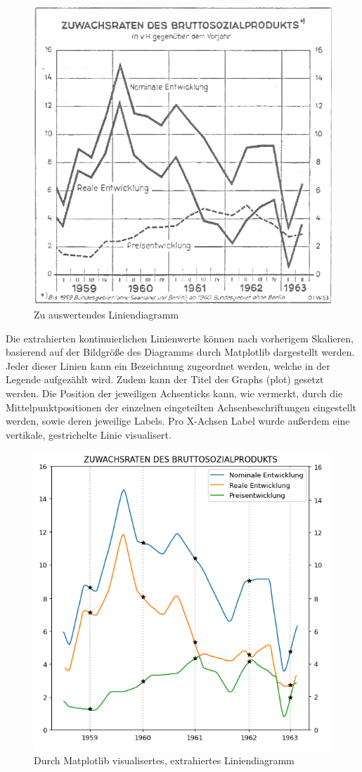 \begin{figure}[H]
    \centering
    \captionsetup{width=.75\linewidth}
    \includegraphics[width=.75\textwidth]{Implementation/img/extraction_input2.png}
    \caption{ Zu auswertendes Liniendiagramm}
    \label{fig:extraction_input}
\end{figure}

Die extrahierten kontinuierlichen Linienwerte können nach vorherigem Skalieren, basierend auf der Bildgröße des Diagramms durch Matplotlib dargestellt werden. Jeder dieser Linien kann ein Bezeichnung zugeordnet werden, welche in der Legende aufgezählt wird. Zudem kann der Titel des Graphs (plot) gesetzt werden. Die Position der jeweiligen Achsenticks kann, wie vermerkt, durch die Mittelpunktpositionen der einzelnen eingeteilten Achsenbeschriftungen eingestellt werden, sowie deren jeweilige Labels. Pro X-Achsen Label wurde außerdem eine vertikale, gestrichelte Linie visualisert.

\begin{figure}[H]
    \centering
    \captionsetup{width=.75\linewidth}
    \includegraphics[width=.75\textwidth]{Implementation/img/extraction_output2.png}
    \caption{ Durch Matplotlib visualisertes, extrahiertes Liniendiagramm}
    \label{fig:extraction_output}
\end{figure}

